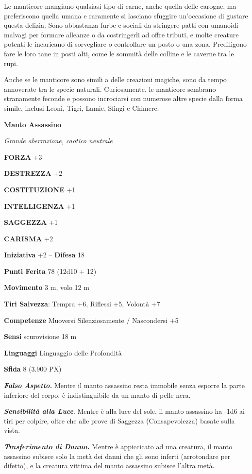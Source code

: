 \begin{multicols}{2}
	Le manticore mangiano qualsiasi tipo di carne, anche quella delle carogne, ma preferiscono quella umana e raramente si lasciano sfuggire un'occasione di gustare questa delizia. Sono abbastanza furbe e sociali da stringere patti con umanoidi malvagi per formare alleanze o da costringerli ad offre tributi, e molte creature potenti le incaricano di sorvegliare o controllare un posto o una zona. Prediligono fare le loro tane in posti alti, come le sommità delle colline e le caverne tra le rupi.

	Anche se le manticore sono simili a delle creazioni magiche, sono da tempo annoverate tra le specie naturali. Curiosamente, le manticore sembrano stranamente feconde e possono incrociarsi con numerose altre specie dalla forma simile, inclusi Leoni, Tigri, Lamie, Sfingi e Chimere.

	\medskip{}\textbf{Manto Assassino}

	\textit{Grande aberrazione, caotico neutrale}

	\textbf{FORZA} +3

	\textbf{DESTREZZA} +2

	\textbf{COSTITUZIONE} +1

	\textbf{INTELLIGENZA} +1

	\textbf{SAGGEZZA} +1

	\textbf{CARISMA} +2

	\textbf{Iniziativa} +2 -- \textbf{Difesa} 18

	\textbf{Punti Ferita} 78 (12d10 + 12)

	\textbf{Movimento} 3 m, volo 12 m

	\textbf{Tiri Salvezza}: Tempra +6, Riflessi +5, Volontà +7

	\textbf{Competenze} Muoversi Silenziosamente / Nascondersi +5

	\textbf{Sensi} scurovisione 18 m

	\textbf{Linguaggi} Linguaggio delle Profondità

	\textbf{Sfida} 8 (3.900 PX)

	\textit{\textbf{Falso Aspetto.}} Mentre il manto assassino resta immobile senza esporre la parte inferiore del corpo, è indistinguibile da un manto di pelle nera.

	\textit{\textbf{Sensibilità alla Luce}}. Mentre è alla luce del sole, il manto assassino ha -1d6 ai tiri per colpire, oltre che alle prove di Saggezza (Consapevolezza) basate sulla vista.

	\textit{\textbf{Trasferimento di Danno.}} Mentre è appiccicato ad una creatura, il manto assassino subisce solo la metà dei danni che gli sono inferti (arrotondare per difetto), e la creatura vittima del manto assassino subisce l'altra metà.


\end{multicols}
